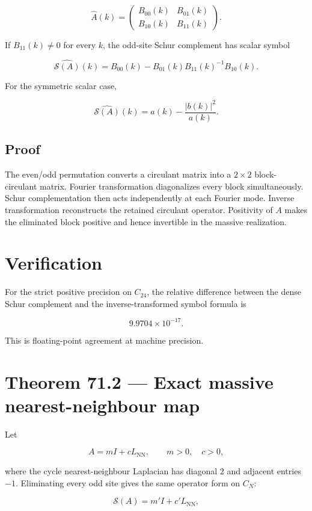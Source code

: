 \documentclass[11pt,a4paper,openany]{report}
\begin{document}
\[
\widehat A(k)
=
\begin{pmatrix}
B_{00}(k)&B_{01}(k)\\
B_{10}(k)&B_{11}(k)
\end{pmatrix}.
\]

If \(B_{11}(k)\ne0\) for every \(k\), the odd-site Schur complement has scalar symbol

\[
\widehat{\mathcal S(A)}(k)
=
B_{00}(k)
-
B_{01}(k)B_{11}(k)^{-1}B_{10}(k).
\]

For the symmetric scalar case,

\[
\widehat{\mathcal S(A)}(k)
=
a(k)-\frac{|b(k)|^2}{a(k)}.
\]

\subsection{Proof}

The even/\allowbreak{}odd permutation converts a circulant matrix into a \(2\times2\) block-circulant matrix. Fourier transformation diagonalizes every block simultaneously. Schur complementation then acts independently at each Fourier mode. Inverse transformation reconstructs the retained circulant operator. Positivity of \(A\) makes the eliminated block positive and hence invertible in the massive realization.

\section{Verification}

For the strict positive precision on \(C_{24}\), the relative difference between the dense Schur complement and the inverse-transformed symbol formula is

\[
9.9704\times10^{-17}.
\]

This is floating-point agreement at machine precision.

\section{Theorem 71.2 --- Exact massive nearest-neighbour map}

Let

\[
A=mI+cL_{\mathrm{NN}},
\qquad m>0,\quad c>0,
\]

where the cycle nearest-neighbour Laplacian has diagonal \(2\) and adjacent entries \(-1\). Eliminating every odd site gives the same operator form on \(C_N\):

\[
\mathcal S(A)=m'I+c'L_{\mathrm{NN}},
\]
\end{document}

